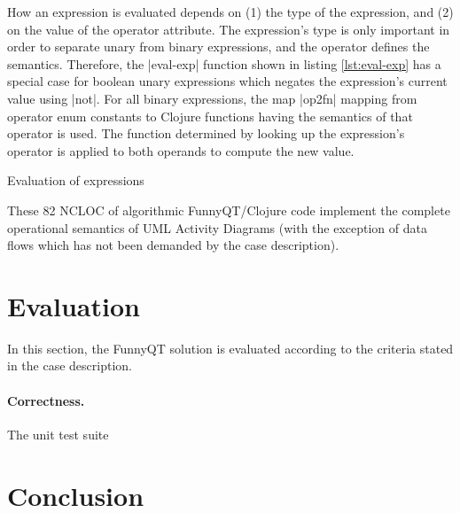 \documentclass[submission]{eptcs}
\newcommand{\code}{\clojureinline}
\begin{document}
How an expression is evaluated depends on (1) the type of the expression, and
(2) on the value of the \textsf{operator} attribute.  The expression's type is
only important in order to separate unary from binary expressions, and the
operator defines the semantics.  Therefore, the \code|eval-exp| function shown
in listing \vref{lst:eval-exp} has a special case for boolean unary expressions
which negates the expression's current value using \code|not|.  For all binary
expressions, the map \code|op2fn| mapping from operator enum constants to
Clojure functions having the semantics of that operator is used.  The function
determined by looking up the expression's operator is applied to both operands
to compute the new value.

\begin{listing}[h!tb]
\caption{Evaluation of expressions}
\label{lst:eval-exp}
\end{listing}

These 82 NCLOC of algorithmic FunnyQT/Clojure code implement the complete
operational semantics of UML Activity Diagrams (with the exception of data
flows which has not been demanded by the case description).

\section{Evaluation}
\label{sec:evaluation}

In this section, the FunnyQT solution is evaluated according to the criteria
stated in the case description.

\paragraph{Correctness.}

The unit test suite 


\section{Conclusion}
\label{sec:conclusion}





\end{document}
